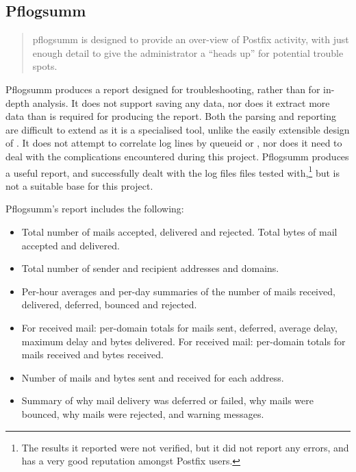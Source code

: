 \subsection{Pflogsumm}

\begin{quotation}

    pflogsumm is designed to provide an over-view of Postfix activity, with
    just enough detail to give the administrator a ``heads up'' for
    potential trouble spots.

\end{quotation}

Pflogsumm produces a report designed for troubleshooting, rather than for
in-depth analysis.  It does not support saving any data, nor does it
extract more data than is required for producing the report.  Both the
parsing and reporting are difficult to extend as it is a specialised tool,
unlike the easily extensible design of \parsername{}.  It does not attempt
to correlate log lines by queueid or \pid{}, nor does it need to deal with
the complications encountered during this project.  Pflogsumm produces a
useful report, and successfully dealt with the \numberOFlogFILES{} log
files files tested with,\footnote{The results it reported were not
verified, but it did not report any errors, and has a very good reputation
amongst Postfix users.} but is not a suitable base for this project.

Pflogsumm's report includes the following:

\begin{itemize}

    \item Total number of mails accepted, delivered and rejected.  Total
        bytes of mail accepted and delivered.

    \item Total number of sender and recipient addresses and domains.

    \item Per-hour averages and per-day summaries of the number of mails
        received, delivered, deferred, bounced and rejected.

    \item For received mail: per-domain totals for mails sent, deferred,
        average delay, maximum delay and bytes delivered.  For received
        mail: per-domain totals for mails received and bytes received.

    \item Number of mails and bytes sent and received for each address.

    \item Summary of why mail delivery was deferred or failed, why mails
        were bounced, why mails were rejected, and warning messages.

\end{itemize}

